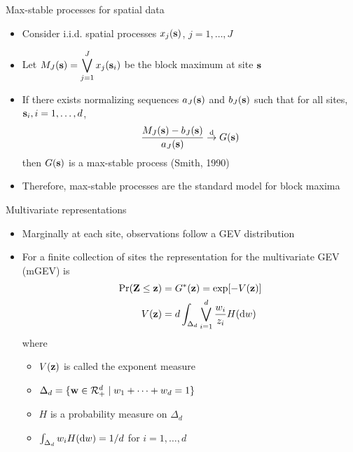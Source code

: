 \documentclass{beamer}
\begin{document}
\begin{frame}{Max-stable processes for spatial data}
	\begin{itemize} \setlength{\itemsep}{1em}
		\item Consider i.i.d. spatial processes $x_j(\mathbf{s})$, $j = 1, \ldots, J$
		\item Let $M_J(\mathbf{s}) = \displaystyle\bigvee_{j=1}^J x_j(\mathbf{s}_i)$ be the block maximum at site $\mathbf{s}$
		\item If there exists normalizing sequences $a_J(\mathbf{s})$ and $b_J(\mathbf{s})$ such that for all sites, $\mathbf{s}_i, i = 1, \ldots, d$,
		\begin{align*}
			\frac{M_J(\mathbf{s}) - b_J(\mathbf{s})}{a_J(\mathbf{s})} \stackrel{\mathrm{d}}{\rightarrow} G(\mathbf{s})
		\end{align*}
		then $G(\mathbf{s})$ is a max-stable process (Smith, 1990)
		\item Therefore, max-stable processes are the standard model for block maxima
	\end{itemize}
\end{frame}

\begin{frame}{Multivariate representations}
	\begin{itemize} \setlength{\itemsep}{1em}
		\item Marginally at each site, observations follow a GEV distribution
		\item For a finite collection of sites the representation for the multivariate GEV (mGEV) is
		\begin{align*}
			\Pr(\mathbf{Z} \le \mathbf{z})  &= G^*(\mathbf{z}) = \exp[-V(\mathbf{z})]\\
			V(\mathbf{z})    &= d \int_{\Delta_d} \bigvee_{i = 1}^d \frac{w_i}{z_i} H(\text{d} w)
		\end{align*}
		where
		\begin{itemize} \setlength{\itemsep}{0.25em}
			\item $V(\mathbf{z})$ is called the exponent measure
			\item $\Delta_d = \{ \mathbf{w} \in {\cal R}^d_+ \mid w_1 + \cdots + w_d = 1\}$
			\item $H$ is a probability measure on $\Delta_d$
			\item $\int_{\Delta_d}w_i H(\text{d} w) = 1 / d$ for $i = 1, \ldots, d$
		\end{itemize}
	\end{itemize}
\end{frame}
\end{document}
